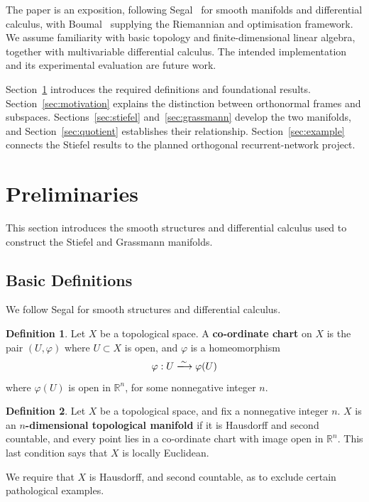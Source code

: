 \documentclass[12pt]{article}
\theoremstyle{definition}
\newtheorem{definition}{Definition}[section]
\theoremstyle{plain}
\theoremstyle{remark}
\newcommand{\R}{\mathbb{R}}
\begin{document}
The paper is an exposition, following Segal~\cite{segal} for smooth manifolds and differential calculus, with Boumal~\cite{boumal} supplying the Riemannian and optimisation framework.
We assume familiarity with basic topology and finite-dimensional linear algebra, together with multivariable differential calculus.
The intended implementation and its experimental evaluation are future work.

Section~\ref{sec:prelim} introduces the required definitions and foundational results.
Section~\ref{sec:motivation} explains the distinction between orthonormal frames and subspaces.
Sections~\ref{sec:stiefel} and~\ref{sec:grassmann} develop the two manifolds, and Section~\ref{sec:quotient} establishes their relationship.
Section~\ref{sec:example} connects the Stiefel results to the planned orthogonal recurrent-network project.

\section{Preliminaries}\label{sec:prelim}

This section introduces the smooth structures and differential calculus used to construct the Stiefel and Grassmann manifolds.

\subsection{Basic Definitions}

We follow Segal \cite[Sections 2--5]{segal} for smooth structures and differential calculus.

\begin{definition}\label{def:co-ordinate-chart}
  Let \( X \) be a topological space.
  A \textbf{co-ordinate chart} on \( X \) is the pair \( (U, \varphi)\) where \( U \subset X \) is open, and \( \varphi \) is a homeomorphism
  \[
    \varphi: U \xlongrightarrow{\sim} \varphi(U)
  \]
  where \( \varphi(U) \) is open in \( \R^n \), for some nonnegative integer \( n \).
\end{definition}

\begin{definition}\label{def:topological-manifold}
  Let \( X \) be a topological space, and fix a nonnegative integer \( n \).
  \( X \) is an \textbf{\( n \)-dimensional topological manifold} if it is Hausdorff and second countable, and every point lies in a co-ordinate chart with image open in \( \R^n \). This last condition says that \( X \) is locally Euclidean.

  We require that \( X \) is Hausdorff, and second countable, as to exclude certain pathological examples.
\end{definition}
\end{document}
